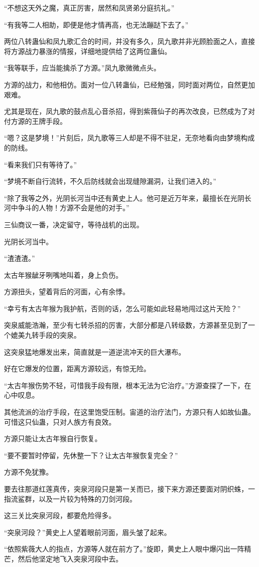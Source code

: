\begin{this_body}
“不想这天外之魔，真正厉害，居然和凤贤弟分庭抗礼。”

“有我等二人相助，即便是他才情再高，也无法蹦跶下去了。”

两位八转蛊仙和凤九歌汇合的时间，并没有多久，凤九歌并非光顾脸面之人，直接将方源战力暴涨的情报，详细地提供给了这两位蛊仙。

“我等联手，应当能擒杀了方源。”凤九歌微微点头。

方源的战力，和他相仿。面对一位八转蛊仙，已经勉强，同时面对两位，自然更加艰难。

尤其是现在，凤九歌的鼓点乱心音杀招，得到紫薇仙子的再次改良，已然成为了对付方源的王牌手段。

“嗯？这是梦境！”片刻后，凤九歌等三人却是不得不驻足，无奈地看向由梦境构成的防线。

“看来我们只有等待了。”

“梦境不断自行流转，不久后防线就会出现缝隙漏洞，让我们进入的。”

“除了我等之外，光阴长河当中还有黄史上人。他可是近万年来，最擅长在光阴长河中争斗的人物！方源不会是他的对手。”

三仙商议一番，决定留守，等待战机的出现。

光阴长河当中。

“渣渣渣。”

太古年猴龇牙咧嘴地叫着，身上负伤。

方源扭头，望着背后的河面，心有余悸。

“幸亏有太古年猴为我护航，否则的话，怎么可能如此轻易地闯过这片天险？”

突泉威能浩瀚，至少有七转杀招的厉害，大部分都是八转级数，方源甚至见到了一个媲美九转手段的突泉。

这突泉猛地爆发出来，简直就是一道逆流冲天的巨大瀑布。

好在它爆发的位置，距离方源较远，有惊无险。

“太古年猴伤势不轻，可惜我手段有限，根本无法为它治疗。”方源查探了一下，在心中叹息。

其他流派的治疗手段，在这里饱受压制。宙道的治疗法门，方源只有人如故仙蛊。可惜这只仙蛊，只对人族方有良效。

方源只能让太古年猴自行恢复。

“要不要暂时停留，先休整一下？让太古年猴恢复完全？”

方源不免犹豫。

要去往那道红莲真传，突泉河段只是第一关而已，接下来方源还要面对阴织蛛，一指流鲨群，以及一片较为特殊的刀剑河段。

这三关比突泉河段，都要危险得多。

“突泉河段？”黄史上人望着眼前河面，眉头皱了起来。

“依照紫薇大人的指点，方源等人就在前方了。”旋即，黄史上人眼中爆闪出一阵精芒，然后他坚定地飞入突泉河段中去。

\end{this_body}

